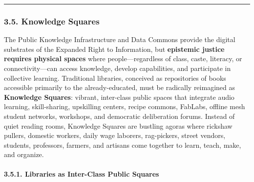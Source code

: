 \begin{center}\rule{0.5\linewidth}{0.5pt}\end{center}

\subsubsection{3.5. Knowledge Squares}\label{knowledge-squares}

The Public Knowledge Infrastructure and Data Commons provide the digital
substrates of the Expanded Right to Information, but \textbf{epistemic
justice requires physical spaces} where people---regardless of class,
caste, literacy, or connectivity---can access knowledge, develop
capabilities, and participate in collective learning. Traditional
libraries, conceived as repositories of books accessible primarily to
the already-educated, must be radically reimagined as \textbf{Knowledge
Squares}: vibrant, inter-class public spaces that integrate audio
learning, skill-sharing, upskilling centers, recipe commons, FabLabs,
offline mesh student networks, workshops, and democratic deliberation
forums. Instead of quiet reading rooms, Knowledge Squares are bustling
agoras where rickshaw pullers, domestic workers, daily wage laborers,
rag-pickers, street vendors, students, professors, farmers, and artisans
come together to learn, teach, make, and organize.

\paragraph{3.5.1. Libraries as Inter-Class Public
Squares}\label{libraries-as-inter-class-public-squares}

